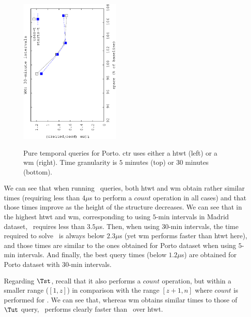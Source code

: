 \begin{figure}[!ht]
\begin{center}
				{\includegraphics[angle=-90,width=0.45\textwidth]{figures_synt/porto_t30mwm.eps}}
		\end{center}
		\vspace{-0.5cm}
		\caption{Pure temporal queries for Porto. \acrlong{ctr} uses either a \acrlong{htwt} (left) or a \acrlong{wm} (right). 
			Time granularity is $5$ minutes (top) or $30$ minutes (bottom).}
		\label{fig:portost_topk}
	\end{figure}



	We can see that when running \Tut\ queries, both \gls{htwt} and \gls{wm} obtain rather similar times (requiring less than 4$\mu$s 
	to perform a $count$ operation in all cases) and that those times improve as the height of the structure decreases. We can see 
	that in the highest \gls{htwt} and \gls{wm}, corresponding to using $5$-min intervals in Madrid dataset, \Tut\ requires less
	than $3.5\mu$s. Then, when using $30$-min intervals, the time required to solve \Tut\ is always below $2.3\mu$s (yet
	\gls{wm} performs faster than \gls{htwt} here), and those times are similar to the ones obtained for Porto dataset when
	using $5$-min intervals. And finally, the best query times (below $1.2\mu$s) are obtained for Porto dataset with 
	$30$-min intervals.

	Regarding $\Tst$, recall that it also performs a $count$ operation, but within a smaller range ($[1,z]$) in comparison with the range
	$[z+1,n]$ where  $count$ is performed for \Tut. We can see that, whereas \gls{wm} obtains similar times to those of 
	$\Tut$ query,  \Tst\ performs clearly faster than \Tut\ over \gls{htwt}.




